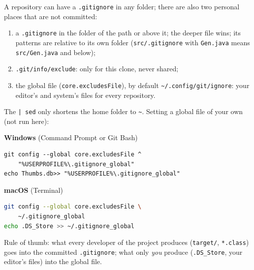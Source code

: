 \documentclass[11pt,a4paper]{article}
\begin{document}
A repository can have a \texttt{.gitignore} in any folder; there are also two personal places that are not committed:


\begin{enumerate}
  \item a \texttt{.gitignore} in the folder of the path or above it; the deeper file wins; its patterns are relative to its own folder
  (\texttt{src/.gitignore} with \texttt{Gen.java} means \texttt{src/Gen.java} and below);
  \item \texttt{.git/info/exclude}: only for this clone, never shared;
  \item the global file (\texttt{core.excludesFile}), by default \texttt{\textasciitilde/.config/git/ignore}: your editor's and system's files for every repository.
\end{enumerate}
The \texttt{| sed} only shortens the home folder to \texttt{\textasciitilde}. Setting a global file of your own (not run here):

\noindent
\begin{minipage}[t]{0.49\linewidth}
\textbf{Windows} (Command Prompt or Git Bash)


\begin{lstlisting}[style=codesnippet, language={}, basicstyle=\ttfamily\footnotesize]
git config --global core.excludesFile ^
    "%USERPROFILE%\.gitignore_global"
echo Thumbs.db>> "%USERPROFILE%\.gitignore_global"
\end{lstlisting}


\end{minipage}\hfill
\begin{minipage}[t]{0.49\linewidth}
\textbf{macOS} (Terminal)


\begin{lstlisting}[style=codesnippet, language=bash, basicstyle=\ttfamily\footnotesize]
git config --global core.excludesFile \
    ~/.gitignore_global
echo .DS_Store >> ~/.gitignore_global
\end{lstlisting}


\end{minipage}

\medskip
Rule of thumb: what every developer of the project produces (\texttt{target/}, \texttt{*.class}) goes into the committed
\texttt{.gitignore}; what only \emph{you} produce (\texttt{.DS\_Store}, your editor's files) into the global file.
\end{document}
